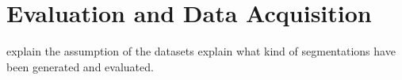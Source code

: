 \chapter{Evaluation and Data Acquisition}

explain the assumption of the datasets
explain what kind of segmentations have been generated and evaluated.